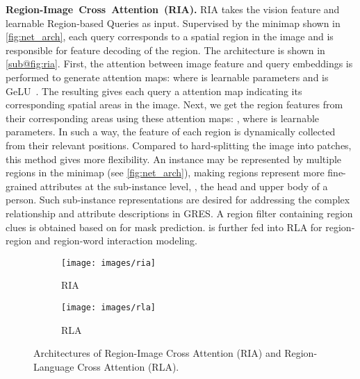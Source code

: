 \documentclass[10pt,twocolumn,letterpaper]{article}
\begin{document}
\textbf{Region-Image~Cross~Attention~(RIA).} 
RIA takes the vision feature  and  learnable Region-based Queries  as input. Supervised by the minimap shown in \cref{fig:net_arch}, each query corresponds to a spatial region in the image and is responsible for feature decoding of the region. 
The architecture is shown in \cref{sub@fig:ria}. First, the attention between image feature  and  query embeddings  is performed to generate  attention maps:
\vspace{-1mm}
where  is  learnable parameters and  is GeLU~\cite{hendrycks2016gaussian}. The resulting  gives each query a  attention map indicating its corresponding spatial areas in the image. Next, we get the region features from their corresponding areas using these attention maps: , where  is  learnable parameters.
In such a way, the feature of each region is dynamically collected from their relevant positions. Compared to hard-splitting the image into patches, this method gives more flexibility. An instance may be represented by multiple regions in the minimap (see \cref{fig:net_arch}), making regions represent more fine-grained attributes at the sub-instance level, \eg, the head and upper body of a person. Such sub-instance representations are desired for addressing the complex relationship and attribute descriptions in GRES. A region filter  containing region clues is obtained based on  for mask prediction.  is further fed into RLA for region-region and region-word interaction modeling.

\begin{figure}[t]
  \centering
  \vspace{0.35em}
  \hfill
  \begin{subfigure}[b]{0.493\linewidth}
      \centering
      \texttt{[image: images/ria]}
      \caption{RIA}
      \label{fig:ria}
  \end{subfigure}
  \hfill
  \begin{subfigure}[b]{0.493\linewidth}
      \centering
      \texttt{[image: images/rla]}
      \caption{RLA}
      \label{fig:rla}
  \end{subfigure}
  \hfill
 \vspace{-0.3in}
  \caption{Architectures of Region-Image Cross Attention (RIA) and Region-Language Cross Attention (RLA).}
  \vspace{-0.16in}
  \label{fig:ria_rla}
\end{figure}
\end{document}
